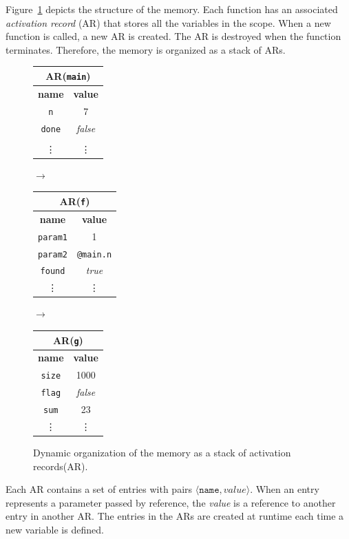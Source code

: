Figure~\ref{fig:ar} depicts the structure of the memory. Each function has an
associated \emph{activation record} (AR) that stores all the variables in the
scope. When a new function is called, a new AR is created. The AR is
destroyed when the function terminates. Therefore, the memory is organized
as a stack of ARs.

\begin{figure}
\begin{center}
\begin{tabular}{|c|c|}
\multicolumn{2}{c}{\textbf{AR(\texttt{main})}} \\
\hline
\textbf{name} & \textbf{value} \\ \hline 
\texttt{n} & 7 \\
\texttt{done} & \emph{false} \\
 & \\
\vdots & \vdots \\
\hline
\end{tabular}
$\longrightarrow$
\begin{tabular}{|c|c|}
\multicolumn{2}{c}{\textbf{AR(\texttt{f})}} \\
\hline
\textbf{name} & \textbf{value} \\ \hline 
\texttt{param1} & 1 \\
\texttt{param2} & \texttt{@main.n} \\
\texttt{found} & \emph{true} \\
\vdots & \vdots \\
\hline
\end{tabular}
$\longrightarrow$
\begin{tabular}{|c|c|}
\multicolumn{2}{c}{\textbf{AR(\texttt{g})}} \\
\hline
\textbf{name} & \textbf{value} \\
\hline 
\texttt{size} & 1000 \\
\texttt{flag} & \emph{false} \\
\texttt{sum} & 23 \\
\vdots & \vdots \\
\hline
\end{tabular}
\end{center}
\caption{Dynamic organization of the memory as a stack of activation
records(AR).}
\label{fig:ar}
\end{figure}

Each AR contains a set of entries with pairs
$\langle\texttt{name},\textit{value}\rangle$. When an entry represents a
parameter passed by reference, the \emph{value} is a reference to another
entry in another AR. The entries in the ARs are created at runtime each time
a new variable is defined.

